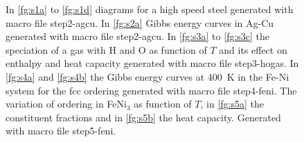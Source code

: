 \documentclass[12pt]{article}
\begin{document}
\begin{figure}[!ht]
%
%
%
%
%
%
\caption{In \ref{fg:s1a} to \ref{fg:s1d} diagrams for a high speed
  steel generated with macro file step2-agcu.  In \ref{fg:s2a} Gibbs
  energy curves in Ag-Cu generated with macro file step2-agcu.  In
  \ref{fg:s3a} to \ref{fg:s3c} the speciation of a gas with H and O as
  function of $T$ and its effect on enthalpy and heat capacity
  generated with macro file step3-hogas.  In \ref{fg:s4a} and
  \ref{fg:s4b} the Gibbs energy curves at 400~K in the Fe-Ni system
  for the fcc ordering generated with macro file step4-feni.  The
  variation of ordering in FeNi$_3$ as function of $T$, in
  \ref{fg:s5a} the constituent fractions and in \ref{fg:s5b} the heat
  capacity.  Generated with macro file step5-feni.}
\end{figure}
\end{document}
